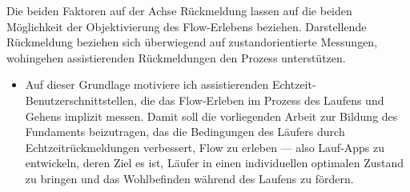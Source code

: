 Die beiden Faktoren auf der Achse Rückmeldung lassen auf die beiden Möglichkeit der Objektivierung des Flow-Erlebens beziehen. Darstellende Rückmeldung beziehen sich überwiegend auf zustandorientierte Messungen, wohingehen assistierenden Rückmeldungen den Prozess unterstützen. 
\begin{itemize}
	
	\item Auf dieser Grundlage motiviere ich assistierenden Echtzeit-Benutzerschnittstellen, die das Flow-Erleben im Prozess des Laufens und Gehens implizit messen. Damit soll die vorliegenden Arbeit zur Bildung des Fundaments beizutragen, das die Bedingungen des Läufers durch Echtzeitrückmeldungen verbessert, Flow zu erleben --- also Lauf-Apps zu entwickeln, deren Ziel es ist, Läufer in einen individuellen optimalen Zustand zu bringen und das Wohlbefinden während des Laufens zu fördern. 
\end{itemize}

